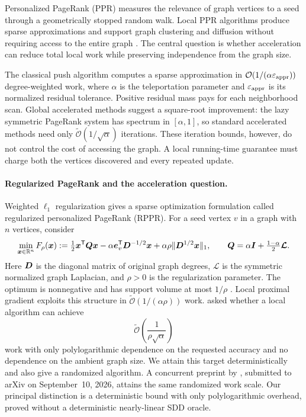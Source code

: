 Personalized PageRank (PPR) measures the relevance of graph vertices to a
seed through a geometrically stopped random walk. Local PPR algorithms
produce sparse approximations and support graph clustering and diffusion
without requiring access to the entire graph
\citep{andersen2006local,andersen2007using}. The central question is whether
acceleration can reduce total local work while preserving independence
from the graph size.

The classical push algorithm computes a sparse approximation in
$\mathcal{O}(1/(\alpha\varepsilon_{\mathrm{appr}}))$ degree-weighted work, where $\alpha$ is the
teleportation parameter and $\varepsilon_{\mathrm{appr}}$ is its normalized residual
tolerance. Positive residual mass pays for each neighborhood scan. Global
accelerated methods suggest a square-root improvement: the lazy symmetric
PageRank system has spectrum in $[\alpha,1]$, so standard accelerated methods need only
$\widetilde{\mathcal{O}}(1/\sqrt\alpha)$ iterations. These iteration bounds,
however, do not control the cost of accessing the graph. A local
running-time guarantee must charge both the vertices discovered and every
repeated update.

\paragraph{Regularized PageRank and the acceleration question.}
Weighted $\ell_1$ regularization gives a sparse optimization formulation
called regularized personalized PageRank (RPPR). For a seed vertex $v$ in
a graph with $n$ vertices, consider
\begin{equation}
 \min_{\bm{x}\in\mathbb{R}^n}
 F_\rho(\bm{x}):=
 \tfrac12\bm{x}^{\mathsf{T}}\bm{Q}\bm{x}-\alpha\bm{e}_{v}^{\mathsf{T}}\bm{D}^{-1/2}\bm{x}
           +\alpha\rho\lVert\bm{D}^{1/2}\bm{x}\rVert_1,
 \qquad
 \bm{Q}=\alpha\bm{I}+\tfrac{1-\alpha}{2}\bm{\mathcal L}.
 \label{eq:intro-rppr-objective}
\end{equation}
Here $\bm{D}$ is the diagonal matrix of original graph degrees,
$\bm{\mathcal L}$ is the symmetric normalized graph Laplacian, and $\rho>0$
is the regularization parameter. The optimum is nonnegative and has
support volume at most $1/\rho$ \citep{fountoulakis2019variational}.
Local proximal gradient exploits this structure in
$\widetilde{\mathcal{O}}(1/(\alpha\rho))$ work.
\citet{fountoulakis2022open} asked whether a local algorithm can achieve
\begin{equation*}
 \widetilde{\mathcal{O}}\!\left(\frac1{\rho\sqrt\alpha}\right)
\end{equation*}
work with only polylogarithmic dependence on the requested accuracy and no dependence on the ambient graph size.
We attain this target deterministically and also give a randomized algorithm.
A concurrent preprint by \citet{cui2026accelerating}, submitted to arXiv on
September~10, 2026, attains the same randomized work scale. Our principal
distinction is a deterministic bound with only polylogarithmic overhead,
proved without a deterministic nearly-linear SDD oracle.

